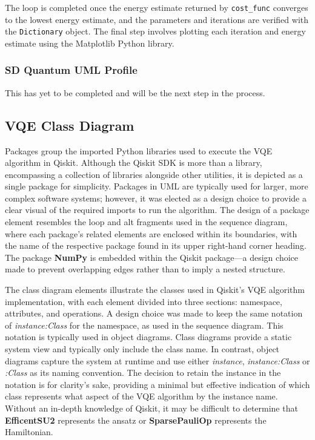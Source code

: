 \documentclass{article}
\begin{document}
The loop is completed once the energy estimate returned by \texttt{cost\_func} converges to the lowest energy estimate, and the parameters and iterations are verified with the \texttt{Dictionary} object. The final step involves plotting each iteration and energy estimate using the Matplotlib Python library.

\subsubsection{SD Quantum UML Profile}

This has yet to be completed and will be the next step in the process.

\subsection{VQE Class Diagram}

Packages group the imported Python libraries used to execute the VQE algorithm in Qiskit. Although the Qiskit SDK is more than a library, encompassing a collection of libraries alongside other utilities\cite{SheriefAbul-Ezz}, it is depicted as a single package for simplicity. Packages in UML are typically used for larger, more complex software systems\cite{VisualParadigm}; however, it was elected as a design choice to provide a clear visual of the required imports to run the algorithm. The design of a package element resembles the loop and alt fragments used in the sequence diagram, where each package's related elements are enclosed within its boundaries, with the name of the respective package found in its upper right-hand corner heading. The package \textbf{NumPy} is embedded within the Qiskit package—a design choice made to prevent overlapping edges rather than to imply a nested structure.

The class diagram elements illustrate the classes used in Qiskit’s VQE algorithm implementation, with each element divided into three sections: namespace, attributes, and operations. A design choice was made to keep the same notation of \textit{instance:Class} for the namespace, as used in the sequence diagram. This notation is typically used in object diagrams. Class diagrams provide a static system view and typically only include the class name. In contrast, object diagrams capture the system at runtime and use either \textit{instance}, \textit{instance:Class} or \textit{:Class} as its naming convention\cite{Seidl_Scholz_Huemer_Kappel_Duffy_2014}. The decision to retain the instance in the notation is for clarity's sake, providing a minimal but effective indication of which class represents what aspect of the VQE algorithm by the instance name. Without an in-depth knowledge of Qiskit, it may be difficult to determine that \textbf{EfficentSU2} represents the ansatz or \textbf{SparsePauliOp} represents the Hamiltonian.
\end{document}
